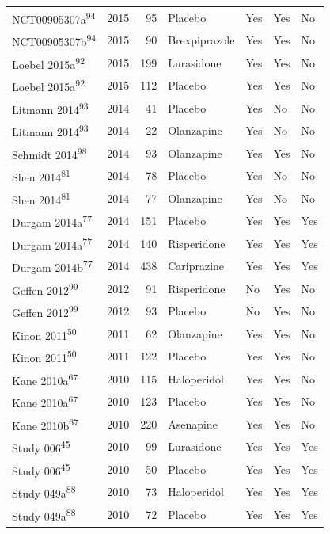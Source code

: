 \documentclass[
  9pt,
  english,
  ,jou,floatsintext]{apa6}
\begin{document}
\begin{longtable}[]{@{}lrrllll@{}}
NCT00905307a\textsuperscript{94} & 2015 & 95 & Placebo & Yes & Yes & No \\
NCT00905307b\textsuperscript{94} & 2015 & 90 & Brexpiprazole & Yes & Yes & No \\
Loebel 2015a\textsuperscript{92} & 2015 & 199 & Lurasidone & Yes & Yes & No \\
Loebel 2015a\textsuperscript{92} & 2015 & 112 & Placebo & Yes & Yes & No \\
Litmann 2014\textsuperscript{93} & 2014 & 41 & Placebo & Yes & No & No \\
Litmann 2014\textsuperscript{93} & 2014 & 22 & Olanzapine & Yes & No & No \\
Schmidt 2014\textsuperscript{98} & 2014 & 93 & Olanzapine & Yes & Yes & No \\
Shen 2014\textsuperscript{81} & 2014 & 78 & Placebo & Yes & No & No \\
Shen 2014\textsuperscript{81} & 2014 & 77 & Olanzapine & Yes & No & No \\
Durgam 2014a\textsuperscript{77} & 2014 & 151 & Placebo & Yes & Yes & Yes \\
Durgam 2014a\textsuperscript{77} & 2014 & 140 & Risperidone & Yes & Yes & Yes \\
Durgam 2014b\textsuperscript{77} & 2014 & 438 & Cariprazine & Yes & Yes & Yes \\
Geffen 2012\textsuperscript{99} & 2012 & 91 & Risperidone & No & Yes & No \\
Geffen 2012\textsuperscript{99} & 2012 & 93 & Placebo & No & Yes & No \\
Kinon 2011\textsuperscript{50} & 2011 & 62 & Olanzapine & Yes & Yes & No \\
Kinon 2011\textsuperscript{50} & 2011 & 122 & Placebo & Yes & Yes & No \\
Kane 2010a\textsuperscript{67} & 2010 & 115 & Haloperidol & Yes & Yes & No \\
Kane 2010a\textsuperscript{67} & 2010 & 123 & Placebo & Yes & Yes & No \\
Kane 2010b\textsuperscript{67} & 2010 & 220 & Asenapine & Yes & Yes & No \\
Study 006\textsuperscript{45} & 2010 & 99 & Lurasidone & Yes & Yes & Yes \\
Study 006\textsuperscript{45} & 2010 & 50 & Placebo & Yes & Yes & Yes \\
Study 049a\textsuperscript{88} & 2010 & 73 & Haloperidol & Yes & Yes & Yes \\
Study 049a\textsuperscript{88} & 2010 & 72 & Placebo & Yes & Yes & Yes \\

\end{longtable}
\end{document}
